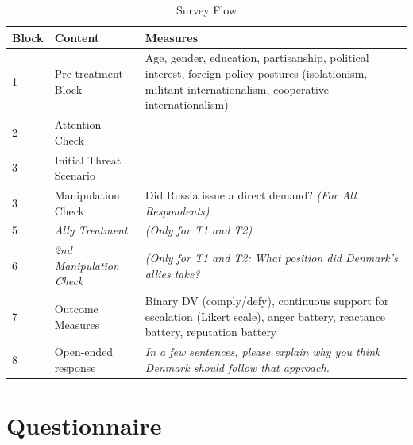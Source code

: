 \begin{table}[H]
  \centering
  \caption{Survey Flow}
  \label{tab:surveyflow}
  \footnotesize
  \begin{tabular}{p{1cm} p{3.5cm} p{8.5cm}}
  \toprule
  \textbf{Block} & \textbf{Content} & \textbf{Measures} \\
  \midrule
  1 & Pre-treatment Block & Age, gender, education, partisanship, political interest, foreign policy postures (isolationism, militant internationalism, cooperative internationalism)
   \\[6pt]
  2 & Attention Check &  \\[6pt]
  3 & Initial Threat Scenario \\ [6pt]
  3 & Manipulation Check  & Did Russia issue a direct demand? \textit{(For All Respondents)} \\[6pt]
  5 & \textit{Ally Treatment} & \textit{(Only for T1 and T2)} \\[6pt]
  6 & \textit{2nd Manipulation Check} & \textit{(Only for T1 and T2: What position did Denmark's allies take?} \\[6pt]
  7 & Outcome Measures & Binary DV (comply/defy), continuous support for escalation (Likert scale), anger battery, reactance battery, reputation battery \\[6pt] 
  8 & Open-ended response & \textit{In a few sentences, please explain why you think Denmark should follow that approach.} \\
  \bottomrule
  \end{tabular}
  \end{table}


\section{Questionnaire}
\label{sec:measurement}
